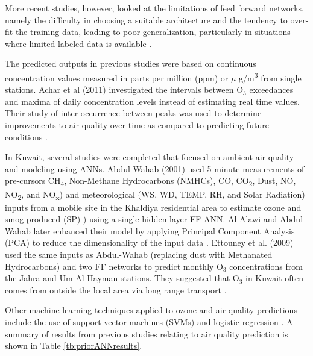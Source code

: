 \documentclass[preprint,12pt,authoryear]{elsarticle}
\begin{document}
\begin{linenumbers}
More recent studies, however, looked at the limitations of feed forward networks, namely the difficulty in choosing a suitable architecture and the tendency to over-fit the training data, leading to poor generalization, particularly in situations where limited labeled data is available \citep{Lu2005, Papaleonidas2013}.  

The predicted outputs in previous studies \citep{Arhami2013} were based on continuous concentration values measured in parts per million (ppm) or $\mu$ g/m\textsuperscript{3} from single stations. Achar et al (2011) investigated the intervals between O$_{3}$ exceedances and maxima of daily concentration levels instead of estimating real time values. Their study of inter-occurrence between peaks was used to determine improvements to air quality over time as compared to predicting future conditions \citep{Achcar2011}. 

In Kuwait, several studies were completed that focused on ambient air quality and modeling using ANNs. Abdul-Wahab (2001) used 5 minute measurements of pre-cursors CH\textsubscript{4}, Non-Methane Hydrocarbons (NMHCs), CO, CO\textsubscript{2}, Dust, NO, NO\textsubscript{2}, and NO\textsubscript{x}) and meteorological (WS, WD, TEMP, RH, and Solar Radiation) inputs from a mobile site in the Khaldiya residential area to estimate ozone and smog produced (SP) \citep{Abdul-Wahab2001}) using a single hidden layer FF ANN. Al-Alawi and Abdul-Wahab later enhanced their model by applying Principal Component Analysis (PCA) to reduce the dimensionality of the input data \citep{Al-Alawi2008}.  Ettouney et al. (2009) used the same inputs as Abdul-Wahab (replacing dust with Methanated Hydrocarbons) and two FF networks to predict monthly O$_{3}$ concentrations from the Jahra and Um Al Hayman stations. They suggested that O$_{3}$ in Kuwait often comes from outside the local area via long range transport \citep{Ettouney2009a}. 

Other machine learning techniques applied to ozone and air quality predictions include the use of support vector machines (SVMs) \citep{Luna2014, Papaleonidas2013, Singh2013} and logistic regression \citep{Zickus2002}. A summary of results from previous studies relating to air quality prediction is shown in Table \ref{tb:priorANNresults}.\\

\end{linenumbers}
	
\end{document}
